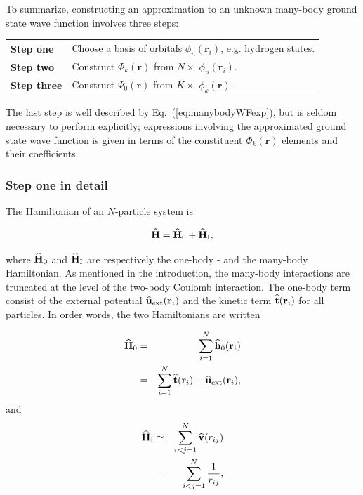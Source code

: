 To summarize, constructing an approximation to an unknown many-body ground state wave function involves three steps:

\begin{center}
\begin{tabular}{l|l}
 \textbf{Step one}   &  Choose a basis of orbitals $\phi_n(\mathbf{r}_i)$, e.g. hydrogen states. \\
 \textbf{Step two}   &  Construct $\Phi_k(\mathbf{r})$ from $N\times$ $\phi_n(\mathbf{r}_i)$.   \\
 \textbf{Step three} &  Construct $\Psi_0(\mathbf{r})$ from $K\times$ $\phi_k(\mathbf{r})$.     \\
\end{tabular}
\end{center}

The last step is well described by Eq.~(\ref{eq:manybodyWFexp}), but is seldom necessary to perform explicitly; expressions involving the approximated ground state wave function is given in terms of the constituent $\Phi_k(\mathbf{r})$ elements and their coefficients.

\subsubsection{Step one in detail}

The Hamiltonian of an $N$-particle system is 

\begin{equation}
 {\bf\widehat{H}} = {\bf\widehat{H}}_0 + {\bf\widehat{H}}_\mathrm{I},
\end{equation}

where ${\bf\widehat{H}}_0$ and ${\bf\widehat{H}}_\mathrm{I}$ are respectively the one-body - and the many-body Hamiltonian. As mentioned in the introduction, the many-body interactions are truncated at the level of the two-body Coulomb interaction. The one-body term consist of the external potential ${\bf\widehat{u}}_\mathrm{ext}(\mathbf{r}_i)$ and the kinetic term ${\bf\widehat{t}}(\mathbf{r}_i)$ for all particles. In order words, the two Hamiltonians are written

\begin{eqnarray}
 {\bf\widehat{H}}_0 &=& \sum_{i=1}^N {\bf\widehat{h}}_0(\mathbf{r}_i) \\
          &=& \sum_{i=1}^N {\bf\widehat{t}}(\mathbf{r}_i) + {\bf\widehat{u}}_\mathrm{ext}(\mathbf{r}_i), \nonumber
  \end{eqnarray}
  and
\begin{eqnarray}
 {\bf\widehat{H}}_\mathrm{I} &\simeq& \sum_{i<j=1}^N {\bf\widehat{v}}(r_{ij}) \\
          &=& \sum_{i<j=1}^N \frac{1}{r_{ij}},  \nonumber
\end{eqnarray}

